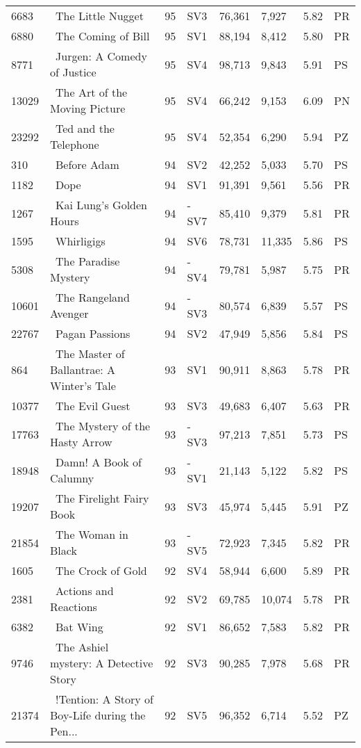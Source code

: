 \begin{longtable}{l | l | l | l | l | l | l | l}
6683 & ~The Little Nugget & 95 & SV3 & 76,361 & 7,927 & 5.82 & PR\\
6880 & ~The Coming of Bill & 95 & SV1 & 88,194 & 8,412 & 5.80 & PR\\
8771 & ~Jurgen: A Comedy of Justice & 95 & SV4 & 98,713 & 9,843 & 5.91 & PS\\
13029 & ~The Art of the Moving Picture & 95 & SV4 & 66,242 & 9,153 & 6.09 & PN\\
23292 & ~Ted and the Telephone & 95 & SV4 & 52,354 & 6,290 & 5.94 & PZ\\
310 & ~Before Adam & 94 & SV2 & 42,252 & 5,033 & 5.70 & PS\\
1182 & ~Dope & 94 & SV1 & 91,391 & 9,561 & 5.56 & PR\\
1267 & ~Kai Lung's Golden Hours & 94 & -SV7 & 85,410 & 9,379 & 5.81 & PR\\
1595 & ~Whirligigs & 94 & SV6 & 78,731 & 11,335 & 5.86 & PS\\
5308 & ~The Paradise Mystery & 94 & -SV4 & 79,781 & 5,987 & 5.75 & PR\\
10601 & ~The Rangeland Avenger & 94 & -SV3 & 80,574 & 6,839 & 5.57 & PS\\
22767 & ~Pagan Passions & 94 & SV2 & 47,949 & 5,856 & 5.84 & PS\\
864 & ~The Master of Ballantrae: A Winter's Tale & 93 & SV1 & 90,911 & 8,863 & 5.78 & PR\\
10377 & ~The Evil Guest & 93 & SV3 & 49,683 & 6,407 & 5.63 & PR\\
17763 & ~The Mystery of the Hasty Arrow & 93 & -SV3 & 97,213 & 7,851 & 5.73 & PS\\
18948 & ~Damn! A Book of Calumny & 93 & -SV1 & 21,143 & 5,122 & 5.82 & PS\\
19207 & ~The Firelight Fairy Book & 93 & SV3 & 45,974 & 5,445 & 5.91 & PZ\\
21854 & ~The Woman in Black & 93 & -SV5 & 72,923 & 7,345 & 5.82 & PR\\
1605 & ~The Crock of Gold & 92 & SV4 & 58,944 & 6,600 & 5.89 & PR\\
2381 & ~Actions and Reactions & 92 & SV2 & 69,785 & 10,074 & 5.78 & PR\\
6382 & ~Bat Wing & 92 & SV1 & 86,652 & 7,583 & 5.82 & PR\\
9746 & ~The Ashiel mystery: A Detective Story & 92 & SV3 & 90,285 & 7,978 & 5.68 & PR\\
21374 & ~!Tention: A Story of Boy-Life during the Pen... & 92 & SV5 & 96,352 & 6,714 & 5.52 & PZ\\

\end{longtable}
